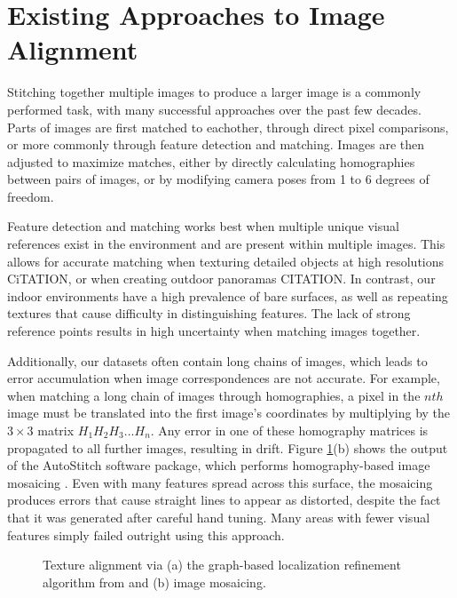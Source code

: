 \documentclass[]{spie}  %
\begin{document}
\section{Existing Approaches to Image Alignment}
\label{sec:existingApproaches}
Stitching together multiple images to produce a larger image is a
commonly performed task, with many successful approaches over the past
few decades. Parts of images are first matched to eachother, through
direct pixel comparisons, or more commonly through feature detection
and matching. Images are then adjusted to maximize matches, either by
directly calculating homographies between pairs of images, or by
modifying camera poses from 1 to 6 degrees of freedom.

Feature detection and matching works best when multiple unique visual
references exist in the environment and are present within multiple
images. This allows for accurate matching when texturing detailed
objects at high resolutions CiTATION, or when creating outdoor
panoramas CITATION. In contrast, our indoor environments have a high
prevalence of bare surfaces, as well as repeating textures that cause
difficulty in distinguishing features. The lack of strong reference
points results in high uncertainty when matching images together.

Additionally, our datasets often contain long chains of images, which
leads to error accumulation when image correspondences are not
accurate. For example, when matching a long chain of images through
homographies, a pixel in the $nth$ image must be translated into the
first image's coordinates by multiplying by the $3\times3$ matrix $H_1
H_2 H_3 ... H_n$. Any error in one of these homography matrices is
propagated to all further images, resulting in drift. Figure
\ref{fig:mosaic3D}(b) shows the output of the AutoStitch software
package, which performs homography-based image mosaicing
\cite{autostitch}. Even with many features spread across this surface,
the mosaicing produces errors that cause straight lines to appear as
distorted, despite the fact that it was generated after careful hand
tuning. Many areas with fewer visual features simply failed outright
using this approach.

\begin{figure}
  \centering

  \centering {}
  \caption{Texture alignment via (a) the graph-based localization
    refinement algorithm from \cite{chen2010indoor} and (b) image
    mosaicing.}
  \label{fig:mosaic3D}
\end{figure}
\end{document}
